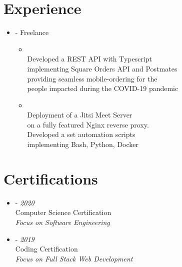 \documentclass[11pt,oneside,a4paper,titlepage]{article}
\begin{document}
\begin{tcolorbox}
\begin{minipage}[t]{10cm}
\begin{tcolorbox}[grow to right by=1cm,colframe=white,colback=white]
      \vspace{-0.6cm}
      \section*{Experience}
      \vspace{-0.2cm}
      \begin{itemize}[]
        \item{{} - Freelance
          \begin{itemize}[leftmargin=-0cm, label={}]
            \vspace{-0.20cm}
              \item{\emph{}\\
                {Developed a {{REST API}} with {{Typescript}}}\\
                {implementing {{Square Orders API}} and {{Postmates}}}\\
                {providing seamless mobile-ordering for the}\\
                {people impacted during the COVID-19 pandemic}}
              \item{\emph{}\\
                {Deployment of a {Jitsi Meet} Server}\\
                {on a fully featured {Nginx} reverse proxy}.\\
                {Developed a set automation scripts}\\
                {implementing {Bash}, {Python}, {Docker}}}
          \end{itemize}}
      \end{itemize}
      \vspace{-0.6cm}
      \section*{Certifications}
      \vspace{-0.2cm}
      \begin{itemize}[]
        \item{
            {{} - \footnotesize{\emph{2020}}}\\
            Computer Science Certification\\
            \emph{Focus on Software Engineering}
          }
        \item{
            {{} - \footnotesize{\emph{2019}}}\\
            {Coding Certification}\\
            \emph{Focus on Full Stack Web Development}
          }
      \end{itemize}


\end{tcolorbox}
\end{minipage}
\end{tcolorbox}
\end{document}
